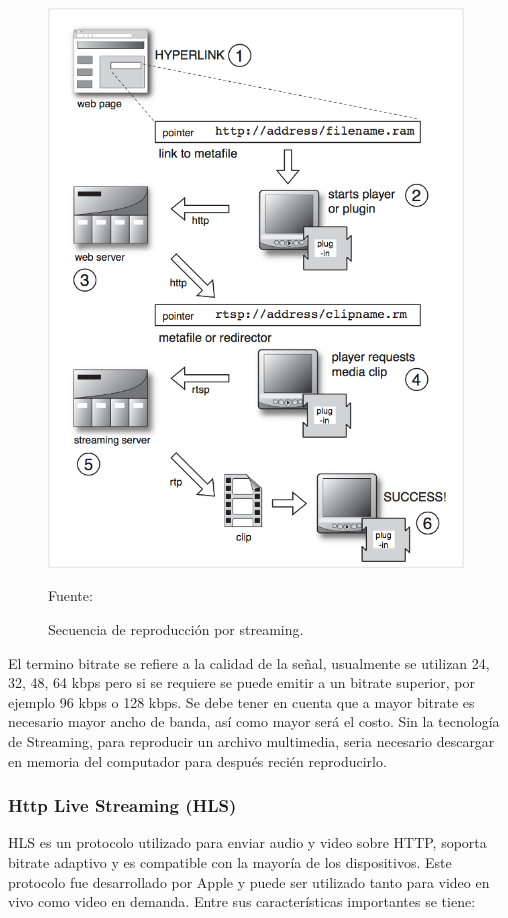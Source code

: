 \begin{figure}[H]
    \begin{center}
        \includegraphics[width=11cm]{img/capitulo_2/streamming.png}
    \end{center}
    \begin{center}
        \caption{Secuencia de reproducción por streaming.}
        Fuente: \cite{streamming:austerberry}
        \label{fig:streamming}
    \end{center}
\end{figure}

El termino bitrate se refiere a la calidad de la señal, usualmente se utilizan 24, 32, 48, 64 kbps pero si se requiere se puede emitir a un bitrate superior, por ejemplo 96 kbps o 128 kbps. Se debe tener en cuenta que a mayor bitrate es necesario mayor ancho de banda, así como mayor será el costo. Sin la tecnología de Streaming, para reproducir un archivo multimedia, seria necesario descargar en memoria del computador para después recién reproducirlo.\\

\subsubsection{Http Live Streaming (HLS)}
HLS es un protocolo utilizado para enviar audio y video sobre HTTP, soporta bitrate adaptivo y es compatible con la mayoría de los dispositivos. Este protocolo fue desarrollado por Apple y puede ser utilizado tanto para video en vivo como video en demanda. Entre sus características importantes se tiene:


